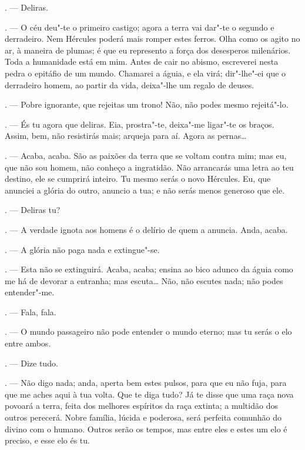 \begin{linenumbers}
\begin{Parskip}
. --- Deliras.

. --- O céu deu"-te o primeiro castigo; agora a terra vai dar"-te
o segundo e derradeiro. Nem Hércules poderá mais romper estes ferros.
Olha como os agito no ar, à maneira de plumas; é que eu represento a
força dos desesperos milenários. Toda a humanidade está em mim. Antes de
cair no abismo, escreverei nesta pedra o epitáfio de um mundo. Chamarei
a águia, e ela virá; dir"-lhe"-ei que o derradeiro homem, ao partir da
vida, deixa"-lhe um regalo de deuses.

. --- Pobre ignorante, que rejeitas um trono! Não, não podes
mesmo rejeitá"-lo.

. --- És tu agora que deliras. Eia, prostra"-te, deixa"-me
ligar"-te os braços. Assim, bem, não resistirás mais; arqueja para aí.
Agora as pernas\ldots{}

. --- Acaba, acaba. São as paixões da terra que se voltam contra
mim; mas eu, que não sou homem, não conheço a ingratidão. Não arrancarás
uma letra ao teu destino, ele se cumprirá inteiro. Tu mesmo serás o novo
Hércules. Eu, que anunciei a glória do outro, anuncio a tua; e não serás
menos generoso que ele.

. --- Deliras tu?

. --- A verdade ignota aos homens é o delírio de quem a anuncia.
Anda, acaba.

. --- A glória não paga nada e extingue"-se.

. --- Esta não se extinguirá. Acaba, acaba; ensina ao bico adunco
da águia como me há de devorar a entranha; mas escuta\ldots{} Não, não
escutes nada; não podes entender"-me.

. --- Fala, fala.

. --- O mundo passageiro não pode entender o mundo eterno; mas tu
serás o elo entre ambos.

. --- Dize tudo.

. --- Não digo nada; anda, aperta bem estes pulsos, para que eu
não fuja, para que me aches aqui à tua volta. Que te diga tudo? Já te
disse que uma raça nova povoará a terra, feita dos melhores espíritos da
raça extinta; a multidão dos outros perecerá. Nobre família, lúcida e
poderosa, será perfeita comunhão do divino com o humano. Outros serão os
tempos, mas entre eles e estes um elo é preciso, e esse elo és tu.


\end{Parskip}
\end{linenumbers}
